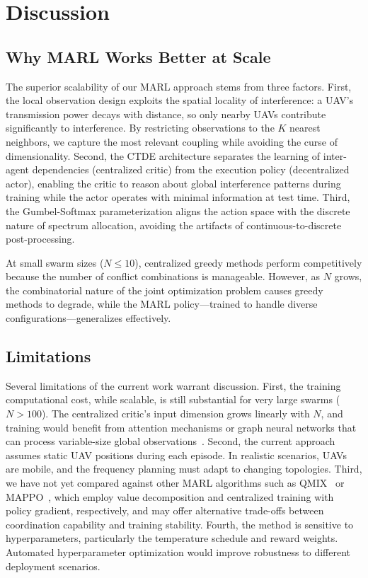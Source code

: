 \documentclass[conference]{IEEEtran}
\begin{document}
\section{Discussion}

\subsection{Why MARL Works Better at Scale}

The superior scalability of our MARL approach stems from three factors. First, the local observation design exploits the spatial locality of interference: a UAV's transmission power decays with distance, so only nearby UAVs contribute significantly to interference. By restricting observations to the $K$ nearest neighbors, we capture the most relevant coupling while avoiding the curse of dimensionality. Second, the CTDE architecture separates the learning of inter-agent dependencies (centralized critic) from the execution policy (decentralized actor), enabling the critic to reason about global interference patterns during training while the actor operates with minimal information at test time. Third, the Gumbel-Softmax parameterization aligns the action space with the discrete nature of spectrum allocation, avoiding the artifacts of continuous-to-discrete post-processing.

At small swarm sizes ($N \leq 10$), centralized greedy methods perform competitively because the number of conflict combinations is manageable. However, as $N$ grows, the combinatorial nature of the joint optimization problem causes greedy methods to degrade, while the MARL policy---trained to handle diverse configurations---generalizes effectively.

\subsection{Limitations}

Several limitations of the current work warrant discussion. First, the training computational cost, while scalable, is still substantial for very large swarms ($N > 100$). The centralized critic's input dimension grows linearly with $N$, and training would benefit from attention mechanisms or graph neural networks that can process variable-size global observations~\cite{ref_attention_marl}. Second, the current approach assumes static UAV positions during each episode. In realistic scenarios, UAVs are mobile, and the frequency planning must adapt to changing topologies. Third, we have not yet compared against other MARL algorithms such as QMIX~\cite{ref_qmix} or MAPPO~\cite{ref_mappo}, which employ value decomposition and centralized training with policy gradient, respectively, and may offer alternative trade-offs between coordination capability and training stability. Fourth, the method is sensitive to hyperparameters, particularly the temperature schedule and reward weights. Automated hyperparameter optimization would improve robustness to different deployment scenarios.
\end{document}
